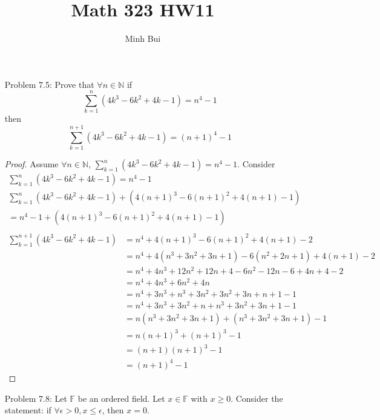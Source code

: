 \documentclass{article}
\author{Minh Bui}
\title{Math 323 HW11}
\theoremstyle{claim}
\theoremstyle{definition}
\begin{document}
\maketitle
\begin{enumerate}
    \item[Problem 7.5:] Prove that $\forall n \in \mathbb{N}$ if
        \begin{equation*}
            \sum\limits_{k=1}^{n} (4k^3 - 6k^2 + 4k - 1) = n^4 - 1
        \end{equation*}
        then
        \begin{equation*}
            \sum\limits_{k=1}^{n+1} (4k^3 - 6k^2 + 4k - 1) = (n + 1)^4 - 1
        \end{equation*}
    \begin{proof}
        Assume $\forall n \in \mathbb{N}$, $\sum\limits_{k = 1}^n (4k^3 - 6k^2 + 4k - 1) = n^4 - 1$.
        Consider
        \begin{gather*}
            \sum\limits_{k=1}^{n} (4k^3 - 6k^2 + 4k - 1) = n^4 - 1\\
            \sum\limits_{k=1}^{n} (4k^3 - 6k^2 + 4k - 1) + (4(n+1)^3 - 6(n+1)^2 + 4(n+1) - 1) \\= n^4 - 1 + (4(n+1)^3 - 6(n+1)^2 + 4(n+1) - 1)\\
        \end{gather*}
        \begin{align*}
            \sum\limits_{k=1}^{n+1} (4k^3 - 6k^2 + 4k - 1) &=  n^4 + 4(n+1)^3 - 6(n+1)^2 + 4(n+1) - 2\\
            & = n^4 + 4(n^3 + 3n^2 + 3n + 1) - 6(n^2 + 2n + 1) + 4(n+1) -2\\
            & = n^4 + 4n^3 + 12n^2 + 12n + 4 - 6n^2 - 12n - 6 + 4n + 4 - 2\\
            & = n^4 + 4n^3 + 6n^2 + 4n\\
            & = n^4 + 3n^3 + n^3 + 3n^2 + 3n^2 + 3n + n + 1 - 1\\
            & = n^4 + 3n^3 + 3n^2 +n + n^3 + 3n^2 + 3n + 1 - 1\\
            & = n(n^3 + 3n^2 + 3n + 1) + (n^3 + 3n^2 + 3n + 1) - 1\\
            & = n(n + 1)^3 + (n+1)^3 - 1\\
            & = (n+1)(n+1)^3 - 1\\
            & = (n+1)^4 - 1
        \end{align*}
    \end{proof}
    \item[Problem 7.8:] Let $\mathbb{F}$ be an ordered field. Let $x \in \mathbb{F}$ with $x \ge 0$. Consider the statement: if $\forall \epsilon > 0, x \le \epsilon$, then $x = 0$.

\end{enumerate}
\end{document}
